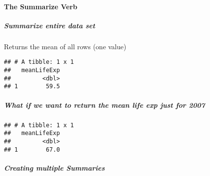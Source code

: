 \documentclass[]{article}
\newenvironment{Shaded}{\begin{snugshade}}{\end{snugshade}}
\newcommand{\KeywordTok}[1]{\textcolor[rgb]{0.13,0.29,0.53}{\textbf{#1}}}
\newcommand{\DataTypeTok}[1]{\textcolor[rgb]{0.13,0.29,0.53}{#1}}
\newcommand{\DecValTok}[1]{\textcolor[rgb]{0.00,0.00,0.81}{#1}}
\newcommand{\StringTok}[1]{\textcolor[rgb]{0.31,0.60,0.02}{#1}}
\newcommand{\OperatorTok}[1]{\textcolor[rgb]{0.81,0.36,0.00}{\textbf{#1}}}
\newcommand{\NormalTok}[1]{#1}
\let\oldparagraph\paragraph
\renewcommand{\paragraph}[1]{\oldparagraph{#1}\mbox{}}
\let\oldsubparagraph\subparagraph
\renewcommand{\subparagraph}[1]{\oldsubparagraph{#1}\mbox{}}
\begin{document}
\paragraph{The Summarize Verb}\label{the-summarize-verb}

\subparagraph{Summarize entire data
set}\label{summarize-entire-data-set}

Returns the mean of all rows (one value)

\begin{Shaded}
\end{Shaded}

\begin{verbatim}
## # A tibble: 1 x 1
##   meanLifeExp
##         <dbl>
## 1        59.5
\end{verbatim}

\subparagraph{What if we want to return the mean life exp just for
2007}\label{what-if-we-want-to-return-the-mean-life-exp-just-for-2007}

\begin{Shaded}
\end{Shaded}

\begin{verbatim}
## # A tibble: 1 x 1
##   meanLifeExp
##         <dbl>
## 1        67.0
\end{verbatim}

\subparagraph{Creating multiple
Summaries}\label{creating-multiple-summaries}

\begin{Shaded}
\end{Shaded}
\end{document}
